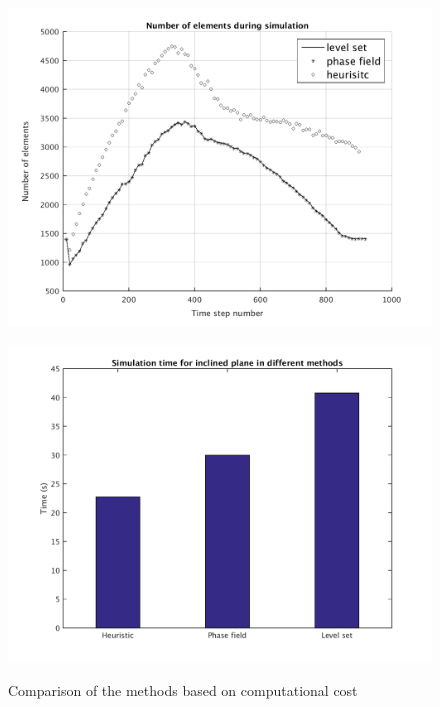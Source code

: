 \documentclass[letterpaper,10pt]{article}
\begin{document}
  
\begin{figure}[H]
        \begin{minipage}[b]{.5\linewidth}
                \centering
                \includegraphics[scale=0.45]{IMAGES/incline_num_elem.png}
                \label{mesh_inc}
                
        \end{minipage}
        \begin{minipage}[b]{.5 \linewidth}
                \centering
                \includegraphics[scale=0.45]{IMAGES/incline_timing1.png}
                \label{barplot_inc}
                
        \end{minipage}
        \caption{Comparison of the methods based on computational cost }
        \label{compinc_comput}
\end{figure}
\end{document}
